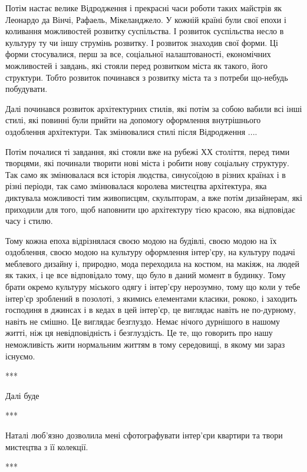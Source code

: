 Потім настає велике Відродження і прекрасні часи роботи таких майстрів як
Леонардо да Вінчі, Рафаель, Мікеланджело. У кожній країні були свої епохи і
коливання можливостей розвитку суспільства. І розвиток суспільства несло в
культуру ту чи іншу струмінь розвитку. І розвиток знаходив свої форми. Ці форми
стосувалися, перш за все, соціальної налаштованості, економічних можливостей і
завдань, які стояли перед розвитком міста як такого, його структури. Тобто
розвиток починався з розвитку міста та з потреби що-небудь побудувати. 

Далі починався розвиток архітектурних стилів, які потім за собою вабили всі
інші стилі, які повинні були прийти на допомогу оформлення внутрішнього
оздоблення архітектури. Так змінювалися стилі після Відродження .... 

Потім почалися ті завдання, які стояли вже на рубежі ХХ століття, перед тими
творцями, які починали творити нові міста і робити нову соціальну структуру.
Так само як змінювалася вся історія людства, синусоїдою в різних країнах і в
різні періоди, так само змінювалася королева мистецтва архітектура, яка
диктувала можливості тим живописцям, скульпторам, а вже потім дизайнерам, які
приходили для того, щоб наповнити цю архітектуру тією красою, яка відповідає
часу і стилю.

Тому кожна епоха відрізнялася своєю модою на будівлі, своєю модою на їх
оздоблення, своєю модою на культуру оформлення інтер'єру, на культуру подачі
меблевого дизайну і, природно, мода переходила на костюм, на макіяж, на людей
як таких, і це все відповідало тому, що було в даний момент в будинку. Тому
брати окремо культуру міського одягу і інтер'єру нерозумно, тому що коли у тебе
інтер'єр зроблений в позолоті, з якимись елементами класики, рококо, і заходить
господиня в джинсах і в кедах в цей інтер'єр, це виглядає навіть не по-дурному,
навіть не смішно. Це виглядає безглуздо. Немає нічого дурнішого в нашому житті,
ніж ця невідповідність і безглуздість. Це те, що говорить про нашу неможливість
жити нормальним життям в тому середовищі, в якому ми зараз існуємо.

***

Далі буде

***

Наталі люб’язно дозволила мені сфотографувати інтер'єри квартири та твори
мистецтва з її колекції.

***

